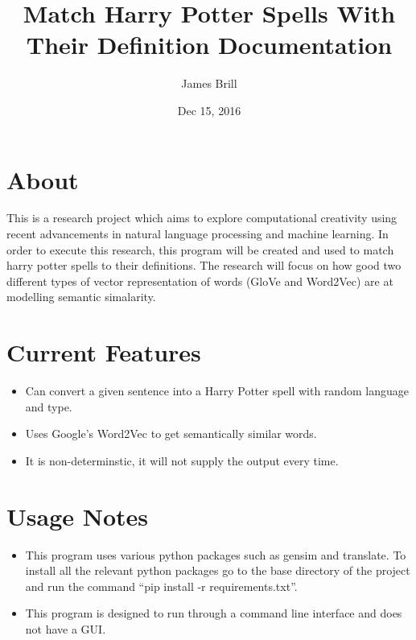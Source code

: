 \documentclass[letterpaper,10pt,english]{sphinxmanual}
\title{Match Harry Potter Spells With Their Definition Documentation}
\date{Dec 15, 2016}
\author{James Brill}
\begin{document}
\maketitle
\sphinxtableofcontents
{}\label{index::doc}



\chapter{About}
\label{index:about}\label{index:welcome-to-match-hp-spells-with-their-definition-s-documentation}
This is a research project which aims to explore computational creativity using recent advancements in natural language processing and machine learning. In order to execute this research, this program will be created and used to match harry potter spells to their definitions. The research will focus on how good two different types of vector representation of words (GloVe and Word2Vec) are at modelling semantic simalarity.


\chapter{Current Features}
\label{index:current-features}\begin{itemize}
\item {} 
Can convert a given sentence into a Harry Potter spell with random language and type.

\item {} 
Uses Google's Word2Vec to get semantically similar words.

\item {} 
It is non-determinstic, it will not supply the output every time.

\end{itemize}


\chapter{Usage Notes}
\label{index:usage-notes}\begin{itemize}
\item {} 
This program uses various python packages such as gensim and translate. To install all the relevant python packages go to the base directory of the project and run the command ``pip install -r requirements.txt''.

\item {} 
This program is designed to run through a command line interface and does not have a GUI.

\end{itemize}
\end{document}
